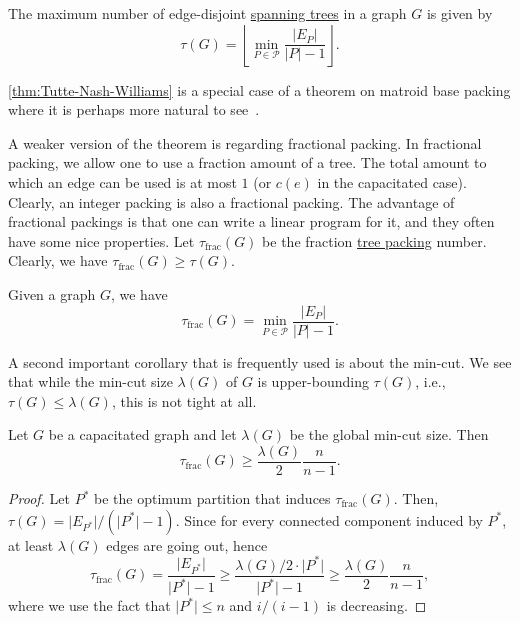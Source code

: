 \begin{theorem}\label{thm:Tutte-Nash-Williams}
	The maximum number of edge-disjoint \hyperref[def:spanning-tree]{spanning trees} in a graph \(G\) is given by
	\[
		\tau (G)
		= \left\lfloor \min _{P \in \mathcal{P} } \frac{\lvert E_P \rvert }{\lvert P \rvert - 1} \right\rfloor.
	\]
\end{theorem}

\begin{remark}
	\autoref{thm:Tutte-Nash-Williams} is a special case of a theorem on matroid base packing where it is perhaps more natural to see~\cite{schrijver2003combinatorial}.
\end{remark}

A weaker version of the theorem is regarding fractional packing. In fractional packing, we allow one to use a fraction amount of a tree. The total amount to which an edge can be used is at most \(1\) (or \(c(e)\) in the capacitated case). Clearly, an integer packing is also a fractional packing. The advantage of fractional packings is that one can write a linear program for it, and they often have some nice properties. Let \(\tau _{\text{frac} } (G)\) be the fraction \hyperref[prb:TP]{tree packing} number. Clearly, we have \(\tau _{\text{frac} }(G) \geq \tau (G)\).

\begin{corollary}\label{col:Tutte-Nash-Williams}
	Given a graph \(G\), we have
	\[
		\tau _{\text{frac} } (G)
		= \min _{P \in \mathcal{P} } \frac{\lvert E_P \rvert }{\lvert P \rvert - 1}.
	\]
\end{corollary}

A second important corollary that is frequently used is about the min-cut. We see that while the min-cut size \(\lambda (G)\) of \(G\) is upper-bounding \(\tau (G)\), i.e., \(\tau (G) \leq \lambda (G)\), this is not tight at all.

\begin{corollary}\label{col:Tutte-Nash-Williams-min-cut}
	Let \(G\) be a capacitated graph and let \(\lambda (G)\) be the global min-cut size. Then
	\[
		\tau _{\text{frac} }(G)
		\geq \frac{\lambda (G)}{2} \frac{n}{n - 1}.
	\]
\end{corollary}
\begin{proof}
	Let \(P^{\ast} \) be the optimum partition that induces \(\tau _{\text{frac} }(G)\). Then, \(\tau (G) = \lvert E_{P^{\ast} } \rvert / (\lvert P^{\ast} \rvert - 1)\). Since for every connected component induced by \(P^{\ast} \), at least \(\lambda (G)\) edges are going out, hence
	\[
		\tau _{\text{frac} }(G)
		= \frac{\lvert E_{P^{\ast} } \rvert }{\lvert P^{\ast}  \rvert - 1}
		\geq \frac{\lambda (G) / 2 \cdot \lvert P^{\ast} \rvert }{\lvert P^{\ast} \rvert - 1}
		\geq \frac{\lambda (G)}{2} \frac{n}{n-1},
	\]
	where we use the fact that \(\lvert P^{\ast} \rvert \leq n\) and \(i / (i - 1)\) is decreasing.
\end{proof}

